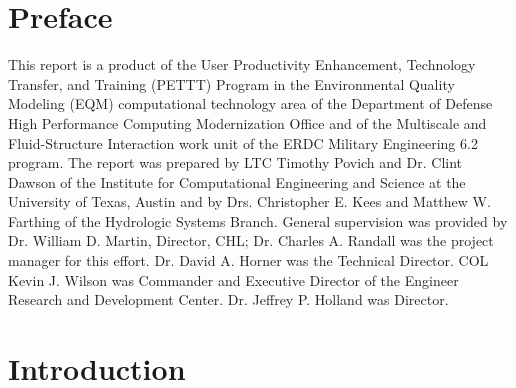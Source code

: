 \documentclass[letterpaper]{erdc}
\begin{document}




\maketitle
\setcounter{tocdepth}{1}
\tableofcontents

\listoffiguresandtables
%
\chapter{Preface}

This report is a product of the User Productivity Enhancement,
Technology Transfer, and Training (PETTT) Program in the Environmental
Quality Modeling (EQM) computational technology area of the Department
of Defense High Performance Computing Modernization Office and of the
Multiscale and Fluid-Structure Interaction work unit of the ERDC
Military Engineering 6.2 program. The report was prepared by LTC
Timothy Povich and Dr. Clint Dawson of the Institute for Computational
Engineering and Science at the University of Texas, Austin and by
Drs. Christopher E. Kees and Matthew W. Farthing of the Hydrologic
Systems Branch.  General supervision was provided by Dr. William
D. Martin, Director, CHL; Dr. Charles A. Randall was the project
manager for this eﬀort. Dr. David A. Horner was the Technical
Director. COL Kevin J. Wilson was Commander and Executive Director of
the Engineer Research and Development Center. Dr. Jeffrey P. Holland
was Director.

\mainmatter

\chapter{Introduction}




\appendix
%
%
\end{document}
